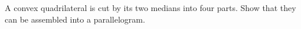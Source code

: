 A convex quadrilateral is cut by its two medians into four parts. Show that they can be assembled into a parallelogram.
